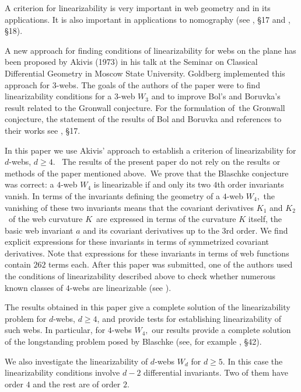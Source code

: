 \documentclass{article}
\begin{document}
A criterion for linearizability is very important in web geometry and in its
applications. It is also important in applications to nomography (see \cite%
{B 55}, \S 17 and \cite{BB 38}, \S 18).

A new approach for finding conditions of linearizability for webs on the
plane has been proposed by Akivis (1973) in his talk at the Seminar on
Classical Differential Geometry in Moscow State University. Goldberg \cite{G
89} implemented this approach for $3$-webs. The goals of the authors of the
paper \cite{GMS 01} were to find linearizability conditions for a $3$-web $%
W_{3}$ and to improve Bol's and Boruvka's result related to the Gronwall
conjecture. For the formulation of\ the Gronwall conjecture, the statement
of the results of Bol and Boruvka and references to their works see \cite{B
55}, \S 17.

In this paper we use Akivis' approach to establish a criterion of
linearizability for $d$-webs, $d\geq 4$. \ The results of the present paper
do not rely on the results or methods of the paper \cite{GMS 01} mentioned
above.\ We prove that the Blaschke conjecture was correct: a $4$-web $W_{4}$
is linearizable if and only its two $4$th order invariants vanish. In terms
of the invariants defining the geometry of a $4$-web $W_{4},$ the vanishing
of these two invariants means that the covariant derivatives $K_{1}$ and $%
K_{2}$\ of the web curvature $K$\ are expressed in terms of the curvature $K$
itself, the basic web invariant $a$ and its covariant derivatives up to the $%
3$rd order. We find explicit expressions for these invariants in terms of
symmetrized covariant derivatives. Note that expressions for these
invariants in terms of web functions contain $262$ terms each. After this
paper was submitted, one of the authors used the conditions of
linearizability described above to check whether numerous known classes of $4
$-webs are linearizable (see \cite{G 04}).

The results obtained in this paper give a complete solution of the
linearizability problem for $d$-webs, $d\geq 4$, and provide tests for
establishing linearizability of such webs. In particular, for $4$-webs $%
W_{4},$ our results provide a complete solution of the longstanding problem
posed by Blaschke (see, for example \cite{B 55}, \S 42).

We also investigate the linearizability of $d$-webs $W_{d}$ for $d\geq 5.$
In this case the linearizability conditions involve $d-2$ differential
invariants. Two of them have order $4$ and the rest are of order $2$.
\end{document}
